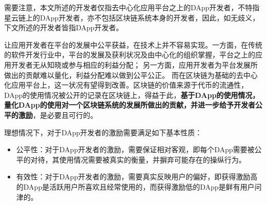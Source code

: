 需要注意，本文所述的开发者仅指去中心化应用平台之上的DApp开发者，不特指星云链上的DApp开发者，亦不包括区块链系统本身的开发者，因此，如无歧义，下文所述的开发者皆指DApp开发者。


让应用开发者在平台的发展中公平获益，在技术上并不容易实现。一方面，在传统的软件开发行业中，平台的发展及获利状况及由中心化的组织掌握，平台之上的应用开发者无从知晓或参与相应的利益分配；
另一方面，应用开发者为平台发展所做出的贡献难以量化，利益分配难以做到公平公正。
而在区块链为基础的去中心化应用平台上，这一状况有望得到改善。区块链的价值来源于代币的流通性，DApp的使用情况被公开的记录在区块链上，得益于此，\textbf{基于DApp的使用情况，
量化DApp的使用对一个区块链系统的发展所做出的贡献，并进一步给予开发者公平的激励}，是必要且可行的。

理想情况下，对于DApp开发者的激励需要满足如下基本性质：
\begin{itemize}
\item 公平性：对于DApp开发者的激励，需要保证相对客观，即每个DApp需要被公平的对待，其使用情况需要被真实的衡量，并摒弃可能存在的操纵行为。
\item 有效性：对于DApp开发者的激励，需要真实反映用户的偏好，即获得激励高的DApp是活跃用户所喜欢且经常使用的，而获得激励低的DApp是鲜有用户问津的。
\begin{comment}
	\item 公开性：链上的DApp激励协议与传统的评奖方式最大的不同在于，所有评分的机制必须是完全公开的，
	且其中任何统计、计算、评选的过程都是全程可见的。
	这样就杜绝了传统中心化评奖暗箱操作的可能。同时也不会出现票数统计出错等情况。
	最后，根据评选结果分配奖励的过程也会保证被执行，奖励分配正如链上交易一样可被追溯。
	\item 有效性：这也是任何评选机制所要满足的基本性质。我们期望DApp评分能够真实反映用户的评价，
	即排名高的DApp是活跃用户所喜欢的且经常被调用的，而评分低的DApp是用户鲜有问津的。
	\item 抗作弊：对于任何排名算法，都需要解决各类作弊问题。对于DIP而言，主要存在两类作弊问题。
	\begin{enumerate}
		\item 女巫攻击：区块链技术的一个重大特点就是一个用户建立新的节点地址代价是很小的。所以一个用户有可能建立多个由他控制的地址，并将他们伪装成多个正常用户来参与评选。
		一个好的激励协议应当保证每个用户无法通过女巫攻击带来巨大额外收益。
		\item 收买：由于我们衡量DApp好坏的主要指标是活跃用户调用的次数，一个DApp开发者有可能收买大量用户让他们调用自己的DApp以提高自己的排名从而获得更多奖励。
		这种作弊方式原则上无法杜绝，但我们期望激励协议能够让此类收买需要付出的代价变得很高以减少其出现的概率。
	\end{enumerate}
\end{comment}
\end{itemize}



